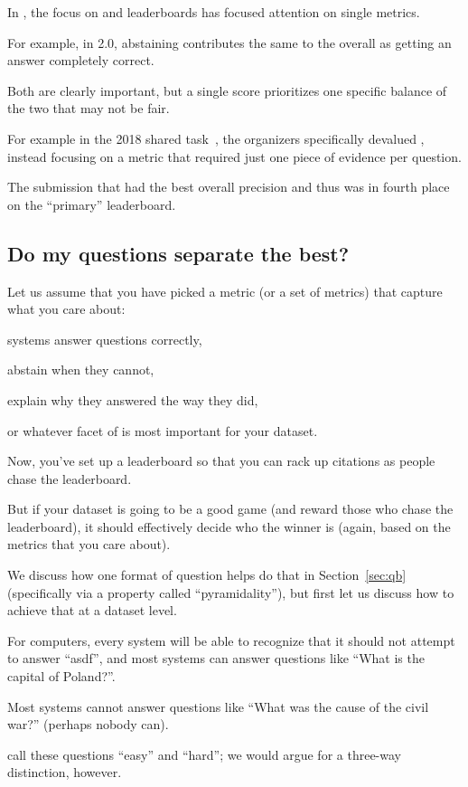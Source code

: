 In \qa{}, the focus on  and leaderboards has focused attention on single metrics.

For example, in \squad{} 2.0, abstaining contributes the same to the overall \fone{} as getting an answer completely correct.

Both are clearly important, but a single score prioritizes one specific balance of the two that may not be fair.

For example in the 2018 \fever{} shared task~\citep{fever-18}, the organizers specifically devalued \fone{}, instead focusing on a metric that required just one piece of evidence per question.

The submission that had the best overall precision and \fone{} thus was in fourth place on the ``primary'' leaderboard.

\subsection{Do my questions separate the best?}
\label{sec:discriminative}

Let us assume that you have picked a metric (or a set of metrics) that capture what you care about:

systems answer questions correctly,

abstain when they cannot,

explain why they answered the way they did,

or whatever facet of  is most important for your dataset.

Now, you've set up a leaderboard so that you can rack up citations as people chase the leaderboard.

But if your dataset is going to be a good game (and reward those who chase the leaderboard), it should effectively decide who the winner is (again, based on the metrics that you care about).

We discuss how one format of question helps do that in Section~\ref{sec:qb} (specifically via a property called ``pyramidality''), but first let us discuss how to achieve that at a dataset level.

For computers, every system will be able to recognize that it should not attempt to answer ``asdf'', and most systems can answer questions like ``What is the capital of Poland?''.

Most systems cannot answer questions like ``What was the cause of the  civil war?'' (perhaps nobody can).

 call these questions ``easy'' and ``hard''; we would argue for a three-way distinction, however.

